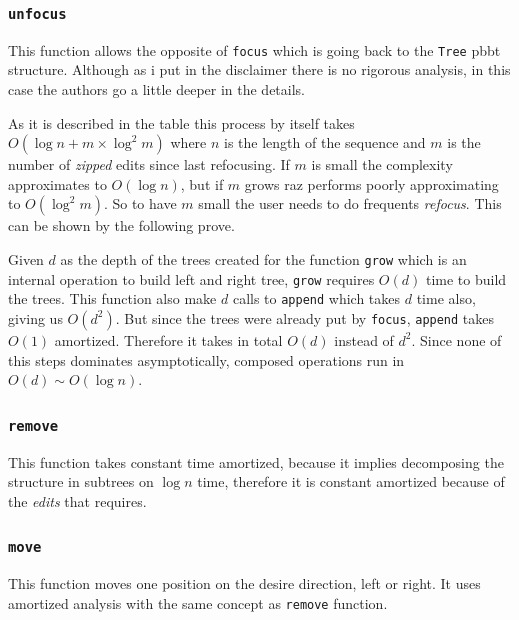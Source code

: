 \documentclass[12pt, a4paper]{article}
\begin{document}
 \subsubsection{%
 \texorpdfstring{\texttt{unfocus}}%
  {-{}-enable-so-version}}

 This function allows the opposite of \texttt{focus} which is going back to the \texttt{Tree} \acrshort{pbbt} structure.
 Although as i put in the disclaimer there is no rigorous analysis, in this case the authors go a little deeper in the details.

 As it is described in the table this process by itself takes $O(\log{n} + m \times \log^2{m})$ where $n$ is the length of the sequence and $m$ is the number of \textit{zipped} edits since last refocusing. If $m$ is small the complexity approximates to $O(\log{n})$, but if $m$ grows \acrshort{raz} performs poorly approximating to $O(\log^2{m})$. So to have $m$ small the user needs to do frequents \textit{refocus}. This can be shown by the following prove.

 Given $d$ as the depth of the trees created for the function \texttt{grow} which is an internal operation to build left and right tree, \texttt{grow} requires $O(d)$ time to build the trees. This function also make $d$ calls to \texttt{append} which takes $d$ time also, giving us $O(d^2)$. But since the trees were already put by \texttt{focus}, \texttt{append} takes $O(1)$ amortized. Therefore it takes in total $O(d)$ instead of $d^2$. Since none of this steps dominates asymptotically, composed operations run in $O(d) \sim O(\log{n})$.

 \subsubsection{%
 \texorpdfstring{\texttt{remove}}%
 {-{}-enable-so-version}}

 This function takes constant time amortized, because it implies decomposing the structure in subtrees on $\log{n}$ time, therefore it is constant amortized because of the \textit{edits} that requires.


 \subsubsection{%
 \texorpdfstring{\texttt{move}}%
 {-{}-enable-so-version}}

 This function moves one position on the desire direction, left or right. It uses amortized analysis with the same concept as \texttt{remove} function.
\end{document}
